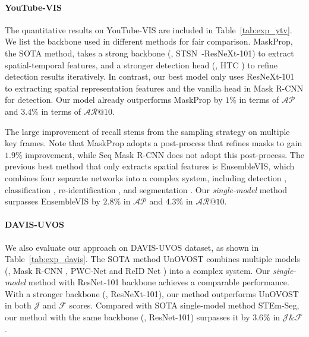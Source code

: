 \documentclass[10pt,twocolumn,letterpaper]{article}
\begin{document}
	\paragraph{YouTube-VIS} 
	The quantitative results on YouTube-VIS are included in Table~\ref{tab:exp_ytv}. We list the backbone \cite{he2016deep,xie2017aggregated,bertasius2018stsn} used in different methods for fair comparison. 
	MaskProp, the SOTA method, takes a strong backbone (\ie, STSN~\cite{bertasius2018stsn}-ResNeXt-101) to extract spatial-temporal features, and a stronger detection head (\ie, HTC \cite{chen2019htc}) to refine detection results iteratively. In contrast, our best model only uses ResNeXt-101 to extracting spatial representation features and the vanilla head in Mask R-CNN for detection. Our model already outperforms MaskProp by $1\%$ in terms of $\mathcal{AP}$ and $3.4\%$ in terms of $\mathcal{AR}@10$.
	
	The large improvement of recall stems from the sampling strategy on multiple key frames.
	Note that MaskProp adopts a post-process that refines masks to gain $1.9\%$ improvement, while Seq Mask R-CNN does not adopt this post-process. 
	The previous best method that only extracts spatial features is EnsembleVIS, which combines four separate networks into a complex system, including detection \cite{he2017mask}, classification \cite{xie2017aggregated}, re-identification \cite{luiten2020unovost}, and segmentation \cite{chen2018deeplabv3}. Our \textit{single-model} method surpasses EnsembleVIS by $2.8\%$ in $\mathcal{AP}$ and $4.3\%$ in $\mathcal{AR}@10$.
	
	\vspace{-0.1in}
	\paragraph{DAVIS-UVOS} 
	We also evaluate our approach on DAVIS-UVOS dataset, as shown in Table~\ref{tab:exp_davis}. 
	The SOTA method UnOVOST combines multiple models (\eg, Mask R-CNN \cite{he2017mask}, PWC-Net \cite{sun2018pwc} and ReID Net \cite{wu2019reidNet}) into a complex system. Our \textit{single-model} method with ResNet-101 backbone achieves a comparable performance. With a stronger backbone (\ie, ResNeXt-101), our method outperforms UnOVOST in both $\mathcal{J}$ and $\mathcal{F}$ scores. 
	Compared with SOTA single-model method STEm-Seg, our method with the same backbone (\ie, ResNet-101) surpasses it by $3.6\%$ in $\mathcal{J\&F}$. 
	
	\vspace{-0.15in}
\end{document}
